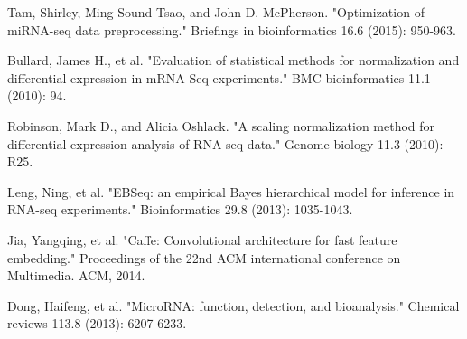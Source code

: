 \documentclass[dvips,12pt]{article}
\begin{document}
%


 
\begin{thebibliography}{99}

 Tam, Shirley, Ming-Sound Tsao, and John D. McPherson. "Optimization of miRNA-seq data preprocessing." Briefings in bioinformatics 16.6 (2015): 950-963.

Bullard, James H., et al. "Evaluation of statistical methods for normalization and differential expression in mRNA-Seq experiments." BMC bioinformatics 11.1 (2010): 94.

Robinson, Mark D., and Alicia Oshlack. "A scaling normalization method for differential expression analysis of RNA-seq data." Genome biology 11.3 (2010): R25.

 Leng, Ning, et al. "EBSeq: an empirical Bayes hierarchical model for inference in RNA-seq experiments." Bioinformatics 29.8 (2013): 1035-1043.

 Jia, Yangqing, et al. "Caffe: Convolutional architecture for fast feature embedding." Proceedings of the 22nd ACM international conference on Multimedia. ACM, 2014.

Dong, Haifeng, et al. "MicroRNA: function, detection, and bioanalysis." Chemical reviews 113.8 (2013): 6207-6233.

\end{thebibliography}
\end{document}
